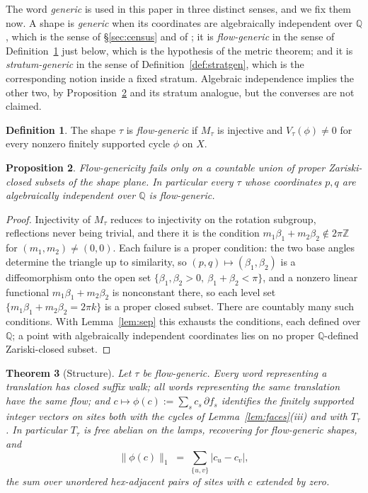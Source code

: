 \documentclass[11pt]{article}
\newtheorem{theorem}{Theorem}[section]
\newtheorem{proposition}[theorem]{Proposition}
\theoremstyle{definition}
\newtheorem{definition}[theorem]{Definition}
\theoremstyle{remark}
\newcommand{\Z}{\mathbb{Z}}
\newcommand{\Q}{\mathbb{Q}}
\begin{document}
The word \emph{generic} is used in this paper in three distinct senses, and we
fix them now. A shape is \emph{generic} when its coordinates are algebraically
independent over $\Q$, which is the sense of \S\ref{sec:census} and of
\cite{IP}; it is \emph{flow-generic} in the sense of Definition~\ref{def:generic}
just below, which is the hypothesis of the metric theorem; and it is
\emph{stratum-generic} in the sense of Definition~\ref{def:stratgen}, which is
the corresponding notion inside a fixed stratum. Algebraic independence implies
the other two, by Proposition~\ref{prop:generic} and its stratum analogue, but
the converses are not claimed.

\begin{definition}\label{def:generic}
The shape $\tau$ is \emph{flow-generic} if $M_\tau$ is injective and
$V_\tau(\phi)\neq0$ for every nonzero finitely supported cycle $\phi$ on $X$.
\end{definition}

\begin{proposition}\label{prop:generic}
Flow-genericity fails only on a countable union of proper Zariski-closed
subsets of the shape plane. In particular every $\tau$ whose coordinates
$p,q$ are algebraically independent over $\Q$ is flow-generic.
\end{proposition}

\begin{proof}
Injectivity of $M_\tau$ reduces to injectivity on the rotation subgroup,
reflections never being trivial, and there it is the condition
$m_1\beta_1+m_2\beta_2\notin2\pi\Z$ for $(m_1,m_2)\neq(0,0)$. Each failure is a
proper condition: the two base angles determine the triangle up to similarity,
so $(p,q)\mapsto(\beta_1,\beta_2)$ is a diffeomorphism onto the open set
$\{\beta_1,\beta_2>0,\ \beta_1+\beta_2<\pi\}$, and a nonzero linear functional
$m_1\beta_1+m_2\beta_2$ is nonconstant there, so each level set
$\{m_1\beta_1+m_2\beta_2=2\pi k\}$ is a proper closed subset. There are countably
many such conditions.
With Lemma~\ref{lem:sep} this exhausts the conditions, each defined over
$\Q$; a point with algebraically independent coordinates lies on no proper
$\Q$-defined Zariski-closed subset.
\end{proof}

\begin{theorem}[Structure]\label{thm:structure}
Let $\tau$ be flow-generic. Every word representing a translation has closed
suffix walk; all words representing the same translation have the same flow;
and $c\mapsto\phi(c):=\sum_s c_s\,\partial f_s$ identifies the finitely
supported integer vectors on sites both with the cycles of
Lemma~\ref{lem:faces}(iii) and with $T_\tau$. In particular $T_\tau$ is free
abelian on the lamps, recovering \cite[Thm.~4.1]{IP} for flow-generic
shapes, and
\begin{equation}\label{eq:norm}
 \|\phi(c)\|_1\;=\;\sum_{\{u,v\}}|c_u-c_v|,
\end{equation}
the sum over unordered hex-adjacent pairs of sites with $c$ extended by zero.
\end{theorem}
\end{document}
